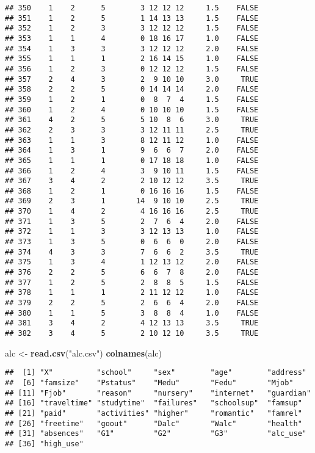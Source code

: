 \documentclass[]{article}
\newenvironment{Shaded}{\begin{snugshade}}{\end{snugshade}}
\newcommand{\KeywordTok}[1]{\textcolor[rgb]{0.13,0.29,0.53}{\textbf{#1}}}
\newcommand{\NormalTok}[1]{#1}
\newcommand{\StringTok}[1]{\textcolor[rgb]{0.31,0.60,0.02}{#1}}
\begin{document}
\begin{verbatim}
## 350    1    2      5        3 12 12 12     1.5    FALSE
## 351    1    2      5        1 14 13 13     1.5    FALSE
## 352    1    2      3        3 12 12 12     1.5    FALSE
## 353    1    1      4        0 18 16 17     1.0    FALSE
## 354    1    3      3        3 12 12 12     2.0    FALSE
## 355    1    1      1        2 16 14 15     1.0    FALSE
## 356    1    2      3        0 12 12 12     1.5    FALSE
## 357    2    4      3        2  9 10 10     3.0     TRUE
## 358    2    2      5        0 14 14 14     2.0    FALSE
## 359    1    2      1        0  8  7  4     1.5    FALSE
## 360    1    2      4        0 10 10 10     1.5    FALSE
## 361    4    2      5        5 10  8  6     3.0     TRUE
## 362    2    3      3        3 12 11 11     2.5     TRUE
## 363    1    1      3        8 12 11 12     1.0    FALSE
## 364    1    3      1        9  6  6  7     2.0    FALSE
## 365    1    1      1        0 17 18 18     1.0    FALSE
## 366    1    2      4        3  9 10 11     1.5    FALSE
## 367    3    4      2        2 10 12 12     3.5     TRUE
## 368    1    2      1        0 16 16 16     1.5    FALSE
## 369    2    3      1       14  9 10 10     2.5     TRUE
## 370    1    4      2        4 16 16 16     2.5     TRUE
## 371    1    3      5        2  7  6  4     2.0    FALSE
## 372    1    1      3        3 12 13 13     1.0    FALSE
## 373    1    3      5        0  6  6  0     2.0    FALSE
## 374    4    3      3        7  6  6  2     3.5     TRUE
## 375    1    3      4        1 12 13 12     2.0    FALSE
## 376    2    2      5        6  6  7  8     2.0    FALSE
## 377    1    2      5        2  8  8  5     1.5    FALSE
## 378    1    1      1        2 11 12 12     1.0    FALSE
## 379    2    2      5        2  6  6  4     2.0    FALSE
## 380    1    1      5        3  8  8  4     1.0    FALSE
## 381    3    4      2        4 12 13 13     3.5     TRUE
## 382    3    4      5        2 10 12 10     3.5     TRUE
\end{verbatim}

\begin{Shaded}
\begin{Highlighting}[]
\NormalTok{alc <-}\StringTok{ }\KeywordTok{read.csv}\NormalTok{(}\StringTok{"alc.csv"}\NormalTok{)}
\KeywordTok{colnames}\NormalTok{(alc)}
\end{Highlighting}
\end{Shaded}

\begin{verbatim}
##  [1] "X"          "school"     "sex"        "age"        "address"   
##  [6] "famsize"    "Pstatus"    "Medu"       "Fedu"       "Mjob"      
## [11] "Fjob"       "reason"     "nursery"    "internet"   "guardian"  
## [16] "traveltime" "studytime"  "failures"   "schoolsup"  "famsup"    
## [21] "paid"       "activities" "higher"     "romantic"   "famrel"    
## [26] "freetime"   "goout"      "Dalc"       "Walc"       "health"    
## [31] "absences"   "G1"         "G2"         "G3"         "alc_use"   
## [36] "high_use"
\end{verbatim}
\end{document}
